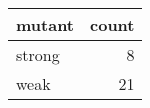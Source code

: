 
\begin{tabular}{lr}
\toprule
mutant & count\\
\midrule
strong & 8\\
weak & 21\\
\bottomrule
\end{tabular}
